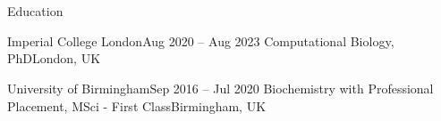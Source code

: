 \section{\faGraduationCap}{Education}

  \resumeEntryStart
    \resumeEntryTSDL
      {Imperial College London}{Aug 2020 -- Aug 2023}
      {Computational Biology, PhD}{London, UK}
  \vspace{6pt}
  
    \resumeEntryTSDL
      {University of Birmingham}{Sep 2016 -- Jul 2020}
      {Biochemistry with Professional Placement, MSci - First Class}{Birmingham, UK}
  \resumeEntryEnd
